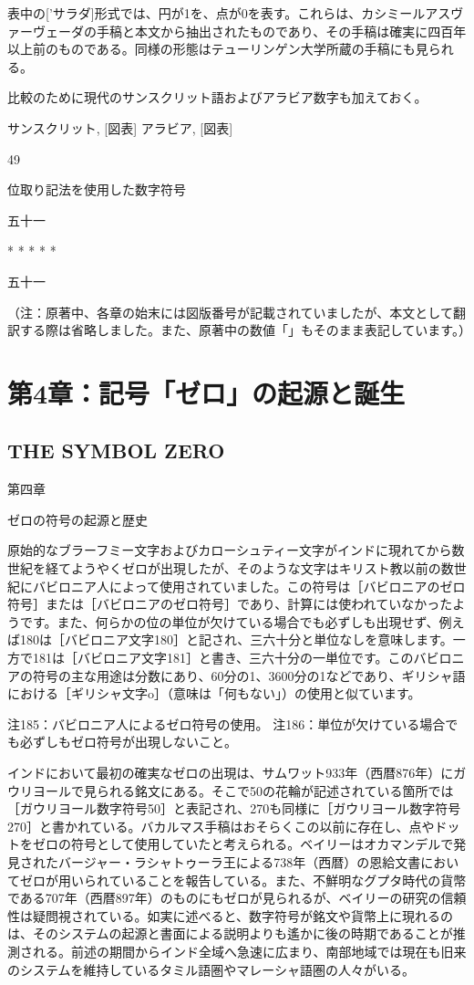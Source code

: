 \documentclass[a4paper,11pt,openany]{ltjsbook}
\begin{document}
表中の['サラダ]形式では、円が1を、点が0を表す。これらは、カシミールアスヴァーヴェーダの手稿と本文から抽出されたものであり、その手稿は確実に四百年以上前のものである。同様の形態はテューリンゲン大学所蔵の手稿にも見られる。

比較のために現代のサンスクリット語およびアラビア数字も加えておく。

サンスクリット, [図表]
 アラビア, [図表]

49

位取り記法を使用した数字符号

五十一

*       *       *       *       *

五十一

（注：原著中、各章の始末には図版番号が記載されていましたが、本文として翻訳する際は省略しました。また、原著中の数値「」もそのまま表記しています。）

\clearpage

\chapter{第4章：記号「ゼロ」の起源と誕生}
\section*{THE SYMBOL ZERO}

第四章

ゼロの符号の起源と歴史

原始的なブラーフミー文字およびカローシュティー文字がインドに現れてから数世紀を経てようやくゼロが出現したが、そのような文字はキリスト教以前の数世紀にバビロニア人によって使用されていました。この符号は［バビロニアのゼロ符号］または［バビロニアのゼロ符号］であり、計算には使われていなかったようです。また、何らかの位の単位が欠けている場合でも必ずしも出現せず、例えば180は［バビロニア文字180］と記され、三六十分と単位なしを意味します。一方で181は［バビロニア文字181］と書き、三六十分の一単位です。このバビロニアの符号の主な用途は分数にあり、60分の1、3600分の1などであり、ギリシャ語における［ギリシャ文字o］（意味は「何もない」）の使用と似ています。

注185：バビロニア人によるゼロ符号の使用。
注186：単位が欠けている場合でも必ずしもゼロ符号が出現しないこと。

インドにおいて最初の確実なゼロの出現は、サムワット933年（西暦876年）にガウリヨールで見られる銘文にある。そこで50の花輪が記述されている箇所では［ガウリヨール数字符号50］と表記され、270も同様に［ガウリヨール数字符号270］と書かれている。バカルマス手稿はおそらくこの以前に存在し、点やドットをゼロの符号として使用していたと考えられる。ベイリーはオカマンデルで発見されたバージャー・ラシャトゥーラ王による738年（西暦）の恩給文書においてゼロが用いられていることを報告している。また、不鮮明なグプタ時代の貨幣である707年（西暦897年）のものにもゼロが見られるが、ベイリーの研究の信頼性は疑問視されている。如実に述べると、数字符号が銘文や貨幣上に現れるのは、そのシステムの起源と書面による説明よりも遙かに後の時期であることが推測される。前述の期間からインド全域へ急速に広まり、南部地域では現在も旧来のシステムを維持しているタミル語圏やマレーシャ語圏の人々がいる。
\end{document}
